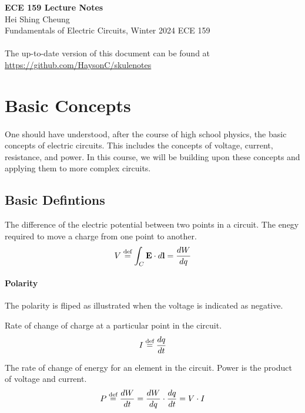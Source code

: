 \documentclass[11pt]{report}
\begin{document}
\thispagestyle{empty}
{\LARGE \bf ECE 159 Lecture Notes}\\
{\large Hei Shing Cheung}\\
Fundamentals of Electric Circuits, Winter 2024 \hfill ECE 159\\
\\
The up-to-date version of this document can be found at \url{https://github.com/HaysonC/skulenotes}\\
\vspace{10pt}
\section{Basic Concepts}
\paragraph{} One should have understood, after the course of high school physics, the basic concepts of electric circuits. This includes the concepts of voltage, current, resistance, and power. In this course, we will be building upon these concepts and applying them to more complex circuits. 
\subsection{Basic Defintions}
\begin{definition}[Voltage]
    The difference of the electric potential between two points in a circuit. The enegy required to move a charge from one point to another.
    \begin{equation}
        V \stackrel{\text{def}}{=} \int_C \textbf{E} \cdot d\textbf{l} = \frac{dW}{dq}
    \end{equation}
    \end{definition}
    \paragraph{Polarity} The polarity is fliped as illustrated when the voltage is indicated as negative.
    \begin{definition}[Current]
    Rate of change of charge at a particular point in the circuit.
    \begin{equation}
        I \stackrel{\text{def}}{=} \frac{dq}{dt}
    \end{equation}
    \end{definition}
    
    \begin{definition}[Power]
    The rate of change of energy for an element in the circuit. Power is the product of voltage and current.
    \begin{equation}
        P \stackrel{\text{def}}{=} \frac{dW}{dt} = \frac{dW}{dq} \cdot \frac{dq}{dt} = V \cdot I
    \end{equation}
    \end{definition}
    
\end{document}
